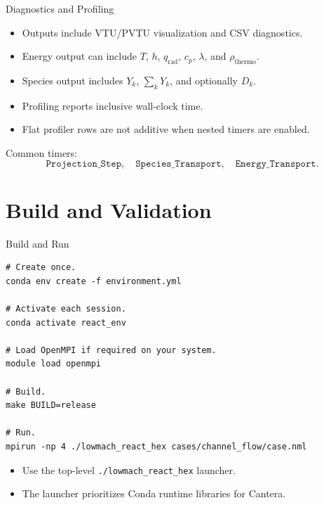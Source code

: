\documentclass[aspectratio=169,11pt]{beamer}
\begin{document}
\begin{frame}{Diagnostics and Profiling}
  \begin{itemize}
    \item Outputs include VTU/PVTU visualization and CSV diagnostics.
    \item Energy output can include \(T\), \(h\), \(q_{\mathrm{rad}}\),
          \(c_p\), \(\lambda\), and \(\rho_{\mathrm{thermo}}\).
    \item Species output includes \(Y_k\), \(\sum_k Y_k\), and optionally \(D_k\).
    \item Profiling reports inclusive wall-clock time.
    \item Flat profiler rows are not additive when nested timers are enabled.
  \end{itemize}

  Common timers:
  \[
    \texttt{Projection\_Step},\quad
    \texttt{Species\_Transport},\quad
    \texttt{Energy\_Transport}.
  \]
\end{frame}

\section{Build and Validation}

\begin{frame}[fragile]{Build and Run}
  \begin{lstlisting}[style=terminal]
# Create once.
conda env create -f environment.yml

# Activate each session.
conda activate react_env

# Load OpenMPI if required on your system.
module load openmpi

# Build.
make BUILD=release

# Run.
mpirun -np 4 ./lowmach_react_hex cases/channel_flow/case.nml
  \end{lstlisting}

  \begin{itemize}
    \item Use the top-level \texttt{./lowmach\_react\_hex} launcher.
    \item The launcher prioritizes Conda runtime libraries for Cantera.
  \end{itemize}
\end{frame}
\end{document}

